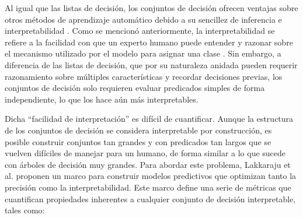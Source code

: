 Al igual que las listas de decisión, los conjuntos de decisión ofrecen ventajas sobre otros métodos de aprendizaje automático debido a su sencillez de inferencia e interpretabilidad \cite{Ignatiev-2018, Liu-2015}. Como se mencionó anteriormente, la interpretabilidad se refiere a la facilidad con que un experto humano puede entender y razonar sobre el mecanismo utilizado por el modelo para asignar una clase \cite{Rudin-2019}. Sin embargo, a diferencia de las listas de decisión, que por su naturaleza anidada pueden requerir razonamiento sobre múltiples características y recordar decisiones previas, los conjuntos de decisión solo requieren evaluar predicados simples de forma independiente, lo que los hace aún más interpretables.

Dicha “facilidad de interpretación” es difícil de cuantificar. Aunque la estructura de los conjuntos de decisión se considera interpretable por construcción, es posible construir conjuntos tan grandes y con predicados tan largos que se vuelven difíciles de manejar para un humano, de forma similar a lo que sucede con árboles de decisión muy grandes. Para abordar este problema, Lakkaraju et al. proponen un marco para construir modelos predictivos que optimizan tanto la precisión como la interpretabilidad. Este marco define una serie de métricas que cuantifican propiedades inherentes a cualquier conjunto de decisión interpretable, tales como:

